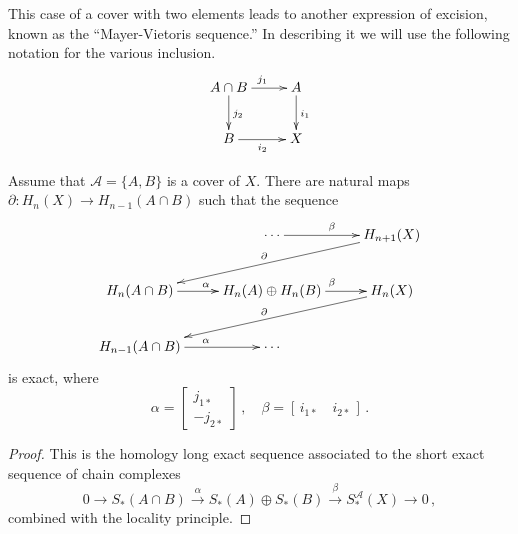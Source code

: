 This case of a cover with two elements leads to another expression of 
excision, known as the ``Mayer-Vietoris sequence.'' In describing it we will
use the following notation for the various inclusion.
\begin{equation*}
\xymatrix{A\cap B\ar[r]^{j_1}\ar[d]^{j_2} & A\ar[d]^{i_1}\\
B\ar[r]_{i_2} & X}
\end{equation*}
\begin{theorem} 
Assume that $\mathscr{A}=\{A,B\}$ is a cover of $X$. There are natural
maps $\partial:H_n(X)\to H_{n-1}(A\cap B)$ such that the sequence
\[
\xymatrix{
& \cdots \ar[r]^\beta & H_{n+1}(X) \ar[dll]_\partial \\
H_n(A\cap B) \ar[r]^\alpha &
H_n(A)\oplus H_n(B) \ar[r]^\beta & H_n(X) \ar[dll]_\partial \\
H_{n-1}(A\cap B) \ar[r]^\alpha & \cdots 
}\]
is exact, where 
\[ 
\alpha=\left[\begin{array}{c}j_{1*}\\-j_{2*}\end{array}\right]\,,\quad
\beta=[\,i_{1*}\quad i_{2*}\,]\,.
\]
\end{theorem}
\begin{proof}
This is the homology long exact sequence associated to the short exact sequence
of chain complexes
\[
0\to S_*(A\cap B)\xrightarrow{\alpha}S_*(A)\oplus S_*(B)\xrightarrow{\beta}
S^{\mathscr{A}}_*(X)\to0\,,
\]
combined with the locality principle.
\end{proof}

